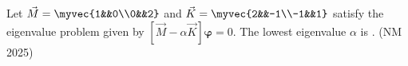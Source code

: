 \item Let $\vec{M}=\myvec{1&&0\\0&&2}$ and $\vec{K}=\myvec{2&&-1\\-1&&1}$  satisfy the eigenvalue problem given by $[\vec{M}-\alpha \vec{K}]\bm{\varphi}=0$.
The lowest eigenvalue $\alpha$ is \underline{\hspace{1cm}}. 
(NM 2025)
